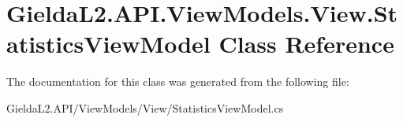 \hypertarget{class_gielda_l2_1_1_a_p_i_1_1_view_models_1_1_view_1_1_statistics_view_model}{}\section{Gielda\+L2.\+A\+P\+I.\+View\+Models.\+View.\+Statistics\+View\+Model Class Reference}
\label{class_gielda_l2_1_1_a_p_i_1_1_view_models_1_1_view_1_1_statistics_view_model}


The documentation for this class was generated from the following file\+:\begin{DoxyCompactItemize}
\item 
Gielda\+L2.\+A\+P\+I/\+View\+Models/\+View/Statistics\+View\+Model.\+cs\end{DoxyCompactItemize}

